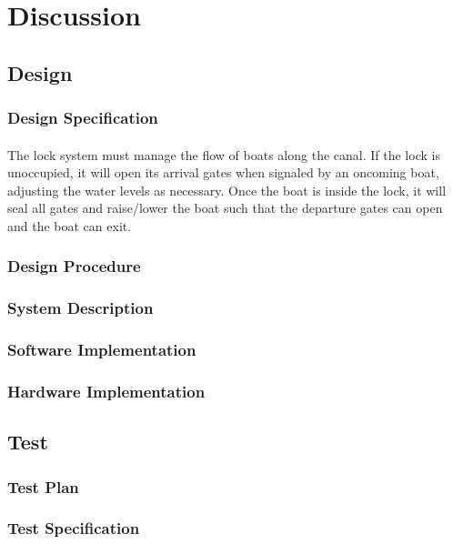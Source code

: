 \documentclass{article}
\begin{document}
\section{Discussion}
	\subsection{Design}
		\subsubsection{Design Specification}
		\paragraph{} The lock system must manage the flow of boats along the canal. If the lock is unoccupied, it will open its arrival gates when signaled by an oncoming boat, adjusting the water levels as necessary. Once the boat is inside the lock, it will seal all gates and raise/lower the boat such that the departure gates can open and the boat can exit.

		\subsubsection{Design Procedure}
		\paragraph{} 

		\subsubsection{System Description}
		\subsubsection{Software Implementation}
		\subsubsection{Hardware Implementation}

	\subsection{Test}
		\subsubsection{Test Plan}
		\subsubsection{Test Specification}
\end{document}
